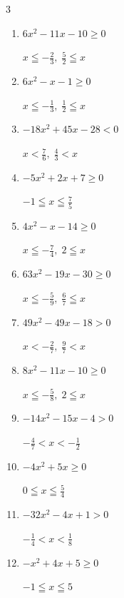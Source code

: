 \begin{multicols}{3}
\begin{enumerate}
        $\displaystyle \frac{1}{8} \leqq x \leqq \frac{9}{8}$

  \item $6x^{2}-11x-10\geq 0$

        $\displaystyle x \leqq -\frac{2}{3} , \; \frac{5}{2} \leqq x$

  \item $6x^{2}-x-1\geq 0$

        $\displaystyle x \leqq -\frac{1}{3} , \; \frac{1}{2} \leqq x$

\columnbreak %

  \item $-18x^{2}+45x-28<0$

        $\displaystyle x < \frac{7}{6} , \; \frac{4}{3} < x$

  \item $-5x^{2}+2x+7\geq 0$

        $\displaystyle -1 \leqq x \leqq \frac{7}{5}$

  \item $4x^{2}-x-14\geq 0$

        $\displaystyle x \leqq -\frac{7}{4} , \; 2 \leqq x$

  \item $63x^{2}-19x-30\geq 0$

        $\displaystyle x \leqq -\frac{5}{9} , \; \frac{6}{7} \leqq x$

  \item $49x^{2}-49x-18>0$

        $\displaystyle x < -\frac{2}{7} , \; \frac{9}{7} < x$

  \item $8x^{2}-11x-10\geq 0$

        $\displaystyle x \leqq -\frac{5}{8} , \; 2 \leqq x$

  \item $-14x^{2}-15x-4>0$

        $\displaystyle -\frac{4}{7} < x < -\frac{1}{2}$

  \item $-4x^{2}+5x\geq 0$

        $\displaystyle 0 \leqq x \leqq \frac{5}{4}$

  \item $-32x^{2}-4x+1>0$

        $\displaystyle -\frac{1}{4} < x < \frac{1}{8}$

  \item $-x^{2}+4x+5\geq 0$

        $\displaystyle -1 \leqq x \leqq 5$


\end{enumerate}
\end{multicols}
